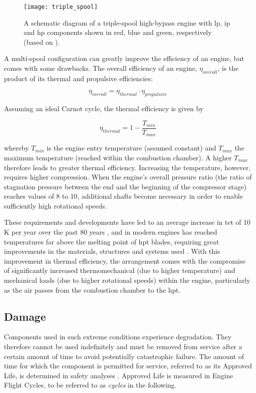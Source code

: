\begin{figure}
    \centering
    \texttt{[image: triple\_spool]}
    \caption{\label{fig:triple_spool} A schematic diagram of a triple-spool high-bypass engine with \ac{lp}, \ac{ip} and \ac{hp} components shown in red, blue and green, respectively (based on \protect\citet{rolls-royce_plc_jet_2015}).}
\end{figure}

A multi-spool configuration can greatly improve the efficiency of an engine, but comes with some drawbacks. The overall efficiency of an engine, \(\eta_{overall}\), is the product of its thermal and propulsive efficiencies:

\[
    \eta_{overall} = \eta_{thermal} \cdot \eta_{propulsive}
\]

Assuming an ideal Carnot cycle, the thermal efficiency is given by

\[
    \eta_{thermal} = 1 - \frac{T_{min}}{T_{max}}
\]

whereby \(T_{min}\) is the engine entry temperature (assumed constant) and \(T_{max}\) the maximum temperature (reached within the combustion chamber). A higher \(T_{max}\) therefore leads to greater thermal efficiency. Increasing the temperature, however, requires %
higher compression. When the engine's overall pressure ratio (the ratio of stagnation pressure between the end and the beginning of the compressor stage) reaches values of 8 to 10, additional shafts become necessary \cite[p. 58]{braunling_flugzeugtriebwerke_2015} in order to enable sufficiently high rotational speeds.

These requirements and developments have led to an average increase in \ac{tet} of 10 K per year over the past 80 years \cite[]{kyprianidis_future_2011}, and in modern engines has reached temperatures far above the melting point of \ac{hpt} blades, requiring great improvements in the materials, structures and systems used \cite[]{spittle_gas_2003}. With this improvement in thermal efficiency, the arrangement comes with the compromise of significantly increased thermomechanical (due to higher temperature) and mechanical loads (due to higher rotational speeds) within the engine, particularly as the air passes from the combustion chamber to the \ac{hpt}.

\subsection{Damage}\label{damage}
Components used in such extreme conditions experience degradation. They therefore cannot be used indefinitely and must be removed from service after a certain amount of time to avoid potentially catastrophic failure. The amount of time for which the component is permitted for service, referred to as its Approved Life, is determined in safety analyses \cite[]{easa_certification_2015}. Approved Life is measured in Engine Flight Cycles, to be referred to as \textit{cycles} in the following.

